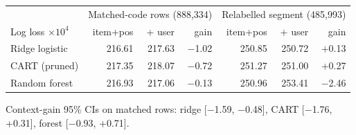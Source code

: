 \begin{tabular}{@{}lrrr@{\hspace{.6cm}}rrr@{}}\toprule
 & \multicolumn{3}{c}{Matched-code rows (888{,}334)} & \multicolumn{3}{c}{Relabelled segment (485{,}993)}\\
Log loss \(\times10^{4}\) & item+pos & + user & gain & item+pos & + user & gain\\\midrule
Ridge logistic & 216.61 & 217.63 & \(-\)1.02 & 250.85 & 250.72 & +0.13 \\
CART (pruned) & 217.35 & 218.07 & \(-\)0.72 & 251.27 & 251.00 & +0.27 \\
Random forest & 216.93 & 217.06 & \(-\)0.13 & 250.96 & 253.41 & \(-\)2.46 \\
\bottomrule\end{tabular}\par\vspace{.15cm}
{\footnotesize\color{muted} Context-gain 95\% CIs on matched rows: ridge [\(-\)1.59, \(-\)0.48], CART [\(-\)1.76, +0.31], forest [\(-\)0.93, +0.71].}